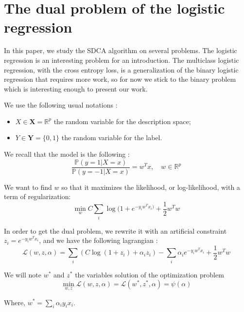 \documentclass{article}
\begin{document}
\newpage
\section{The dual problem of the logistic regression}

In this paper, we study the SDCA algorithm on several problems.
The logistic regression is an interesting problem for an introduction.
The multiclass logistic regression, with the cross entropy loss, is a generalization of the binary logistic regression that requires more work, so for now we stick to the binary problem which is interesting enough to present our work.

We use the following usual notations :
\begin{itemize}
	\item[] $X \in \mathbf{X} = \mathbb{R}^p$ the random variable for the description space;
	\item[] $Y \in \mathbf{Y} = \{0,1\}$ the random variable for the label.
\end{itemize}

We recall that the model is the following :
\begin{equation}
	\frac{\mathbb{P}(y=1 | X=x)}{\mathbb{P}(y=-1 |X=x)} = w^T x, \quad w \in \mathbb{R}^p
\end{equation}

We want to find $w$ so that it maximizes the likelihood, or log-likelihood, with a term of regularization:
\begin{equation}
	\min_w C \sum_i \log(1 + e^{-y_iw^Tx_i)}  + \frac{1}{2} w^Tw
\end{equation}

In order to get the dual problem, we rewrite it with an artificial constraint $z_i = e^{-y_iw^Tx_i}$, and we have the following lagrangian :
\begin{equation}
	\mathcal{L}(w, z, \alpha) = \sum_i (C \log(1+z_i) + \alpha_i z_i) - \sum_i \alpha_i e^{-y_iw^Tx_i} + \frac{1}{2}w^Tw 
\end{equation}

We will note $w^*$ and $z^*$ the variables solution of the optimization problem
\begin{equation}
	\min_{w, z} \mathcal{L}(w, z, \alpha) = \mathcal{L}(w^*, z^*, \alpha) = \psi(\alpha) 
\end{equation}

Where, $w^* = \sum_i \alpha_i y_i x_i$.
\end{document}
